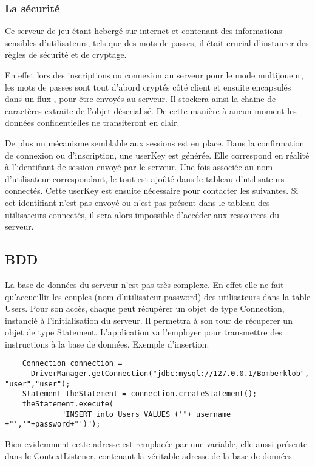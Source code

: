 		
	\subsubsection{La sécurité}
	
		Ce serveur de jeu étant hebergé sur internet et contenant des informations
		sensibles d'utilisateurs, tels que des mots de passes, il était crucial
		d'instaurer des règles de sécurité et de cryptage. 
		
		En effet lors des inscriptions ou connexion au serveur pour le mode
		multijoueur, les mots de passes sont tout d'abord cryptés côté client et
		ensuite encapsulés dans un flux , pour être envoyés au serveur. Il
		stockera ainsi la chaine de caractères extraite de l'objet déserialisé. De cette
		manière à aucun moment les données confidentielles ne transiteront en clair.
		
		De plus un mécanisme semblable aux sessions est en place. Dans la
		confirmation de connexion ou d'inscription, une userKey est générée. Elle correspond en
		réalité à l'identifiant de session envoyé par le serveur. Une fois associée
		au nom d'utilisateur correspondant, le tout est ajoûté dans le tableau
		d'utilisateurs connectés.
		Cette userKey est ensuite nécessaire pour contacter les 
		suivantes. Si cet identifiant n'est pas envoyé ou n'est pas présent dans le tableau des
		utilisateurs connectés, il sera alors impossible d'accéder aux ressources du
		serveur.
		
\subsection{BDD}

	La base de données du serveur n'est pas très complexe. En effet elle ne fait
	qu'accueillir les couples (nom d'utilisateur,password) des utilisateurs dans la
	table Users. 
	Pour son accès, chaque  peut récupérer un objet de type Connection,
	instancié à l'initialisation du serveur. Il permettra à son tour
	de récuperer un objet de type Statement. L'application va l'employer pour
	transmettre des instructions à la base de données.
	Exemple d'insertion: 
		
	\begin{verbatim}
	Connection connection = 
	  DriverManager.getConnection("jdbc:mysql://127.0.0.1/Bomberklob", "user","user");
	Statement theStatement = connection.createStatement();
	theStatement.execute(
		     "INSERT into Users VALUES ('"+ username +"','"+password+"')");
	\end{verbatim}
	
	Bien evidemment cette adresse est remplacée par une variable, elle aussi
	présente dans le ContextListener, contenant la véritable adresse de la base de
	données.
	
	
	
	